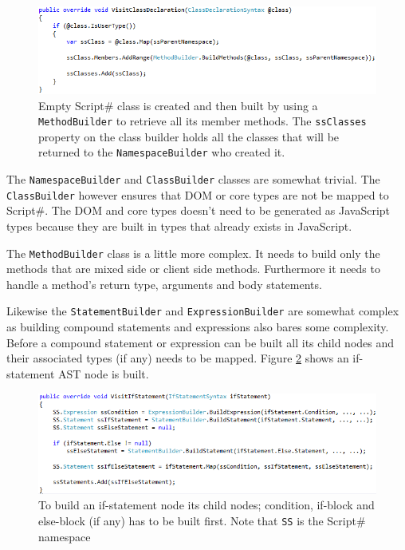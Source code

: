 	\begin{figure}[H]
		\begin{center}
			\centerline{\includegraphics[width=16cm]{resources/images/VisitClassDeclaration.png}}
		\end{center}
		\caption{Empty Script\# class is created and then built by using a \texttt{MethodBuilder} to retrieve all its member methods. The \texttt{ssClasses} property on the class builder holds all the classes that will be returned to the \texttt{NamespaceBuilder} who created it.}
		\label{visitClassDeclaration}
	\end{figure}

	The \texttt{NamespaceBuilder} and \texttt{ClassBuilder} classes are somewhat trivial. The \texttt{ClassBuilder} however ensures that DOM or core types are not be mapped to Script\#. The DOM and core types doesn't need to be generated as JavaScript types because they are built in types that already exists in JavaScript.

	The \texttt{MethodBuilder} class is a little more complex. It needs to build only the methods that are mixed side or client side methods. Furthermore it needs to handle a method’s return type, arguments and body statements. 

	Likewise the \texttt{StatementBuilder} and \texttt{ExpressionBuilder} are somewhat complex as building compound statements and expressions also bares some complexity. Before a compound statement or expression can be built all its child nodes and their associated types (if any) needs to be mapped. Figure \ref{visitIfStatement} shows an if-statement AST node is built.

	\begin{figure}[H]
		\begin{center}
			\centerline{\includegraphics[width=16cm]{resources/images/VisitIfStatement.png}}
		\end{center}
		\caption{To build an if-statement node its child nodes; condition, if-block and else-block (if any) has to be built first. Note that \texttt{SS} is the Script\# namespace}
		\label{visitIfStatement}
	\end{figure}

